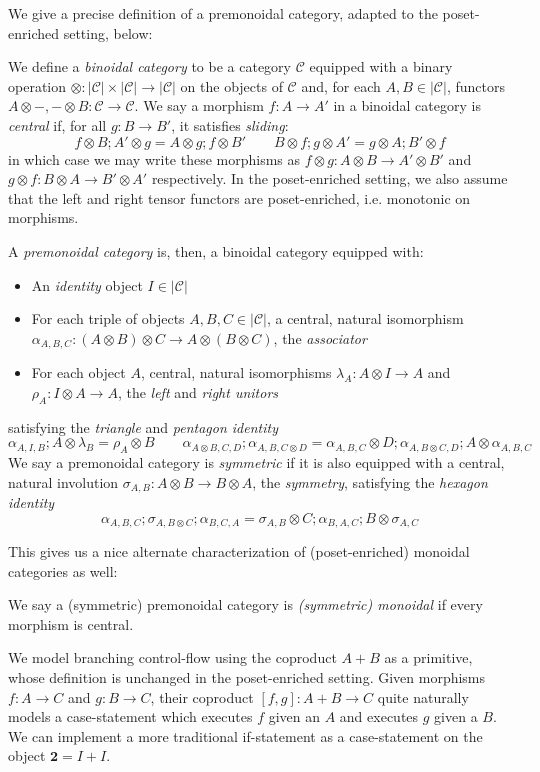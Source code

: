 \documentclass[acmsmall,screen,review]{acmart}
\newcommand{\mc}[1]{\ensuremath{\mathcal{#1}}}
\newcommand{\mb}[1]{\ensuremath{\mathbf{#1}}}
\begin{document}
We give a precise definition of a premonoidal category, adapted to the poset-enriched setting,
below:
\begin{definition}
  We define a \emph{binoidal category} to be a category $\mc{C}$ equipped with a binary operation
  $\otimes : |\mc{C}| \times |\mc{C}| \to |\mc{C}|$ on the objects of $\mc{C}$ and, for each $A, B
  \in |\mc{C}|$, functors $A \otimes -, - \otimes B : \mc{C} \to \mc{C}$. We say a morphism $f : A
  \to A'$ in a binoidal category is \emph{central} if, for all $g : B \to B'$, it satisfies
  \emph{sliding}:
  $$
  f \otimes B ; A' \otimes g = A \otimes g ; f \otimes B' \qquad
  B \otimes f ; g \otimes A' = g \otimes A ; B' \otimes f
  $$
  in which case we may write these morphisms as $f \otimes g : A \otimes B \to A' \otimes B'$ and $g
  \otimes f : B \otimes A \to B' \otimes A'$ respectively. In the poset-enriched setting, we also
  assume that the left and right tensor functors are poset-enriched, i.e. monotonic on morphisms.
  
  A \emph{premonoidal category} is, then, a
  binoidal category equipped with:
  \begin{itemize}
    \item An \emph{identity} object $I \in |\mc{C}|$
    \item For each triple of objects $A, B, C \in |\mc{C}|$, a central, natural isomorphism
    $\alpha_{A, B, C} : (A \otimes B) \otimes C \to A \otimes (B \otimes C)$, the \emph{associator}
    \item For each object $A$, central, natural isomorphisms $\lambda_A : A \otimes I \to A$ and
    $\rho_A : I \otimes A \to A$, the \emph{left} and \emph{right unitors}
  \end{itemize}
  satisfying the \emph{triangle} and \emph{pentagon identity}
  $$
  \alpha_{A, I, B} ; A \otimes \lambda_B = \rho_A \otimes B \qquad
  \alpha_{A \otimes B, C, D} ; \alpha_{A, B, C \otimes D}
  = \alpha_{A, B, C} \otimes D ; \alpha_{A, B \otimes C, D} ; A \otimes \alpha_{A, B, C}
  $$
  We say a premonoidal category is \emph{symmetric} if it is also equipped with a central, natural
  involution $\sigma_{A, B} : A \otimes B \to B \otimes A$, the \textit{symmetry}, satisfying the
  \emph{hexagon identity}
  $$
  \alpha_{A, B, C} ; \sigma_{A, B \otimes C} ; \alpha_{B, C, A}
  = \sigma_{A, B} \otimes C ; \alpha_{B, A, C} ; B \otimes \sigma_{A, C}
  $$
\end{definition}
This gives us a nice alternate characterization of (poset-enriched) monoidal categories as well:
\begin{definition}
  We say a (symmetric) premonoidal category is \emph{(symmetric) monoidal} if every morphism is
  central.
\end{definition}
We model branching control-flow using the coproduct $A + B$ as a primitive, whose definition is
unchanged in the poset-enriched setting. Given morphisms $f : A \to C$ and $g : B \to C$, their
coproduct $[f, g] : A + B \to C$ quite naturally models a case-statement which executes $f$ given an
$A$ and executes $g$ given a $B$. We can implement a more traditional if-statement as a
case-statement on the object $\mb{2} = I + I$.
\end{document}
